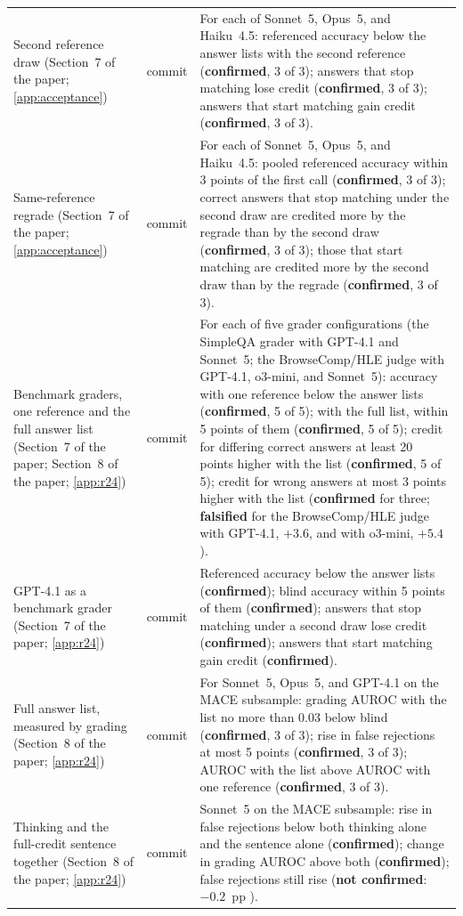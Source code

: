 {\begin{longtable}{L{3.2cm}L{1.1cm}L{8.7cm}}
Second reference draw (Section~7 of the paper; \cref{app:acceptance}) & commit & For each of Sonnet~5, Opus~5, and Haiku~4.5: referenced accuracy below the answer lists with the second reference (\textbf{confirmed}, 3 of 3); answers that stop matching lose credit (\textbf{confirmed}, 3 of 3); answers that start matching gain credit (\textbf{confirmed}, 3 of 3). \\
Same-reference regrade (Section~7 of the paper; \cref{app:acceptance}) & commit & For each of Sonnet~5, Opus~5, and Haiku~4.5: pooled referenced accuracy within 3 points of the first call (\textbf{confirmed}, 3 of 3); correct answers that stop matching under the second draw are credited more by the regrade than by the second draw (\textbf{confirmed}, 3 of 3); those that start matching are credited more by the second draw than by the regrade (\textbf{confirmed}, 3 of 3). \\
Benchmark graders, one reference and the full answer list (Section~7 of the paper; Section~8 of the paper; \cref{app:r24}) & commit & For each of five grader configurations (the SimpleQA grader with GPT-4.1 and Sonnet~5; the BrowseComp/HLE judge with GPT-4.1, o3-mini, and Sonnet~5): accuracy with one reference below the answer lists (\textbf{confirmed}, 5 of 5); with the full list, within 5 points of them (\textbf{confirmed}, 5 of 5); credit for differing correct answers at least 20 points higher with the list (\textbf{confirmed}, 5 of 5); credit for wrong answers at most 3 points higher with the list (\textbf{confirmed} for three; \textbf{falsified} for the BrowseComp/HLE judge with GPT-4.1, $+3.6$, and with o3-mini, $+5.4$). \\
GPT-4.1 as a benchmark grader (Section~7 of the paper; \cref{app:r24}) & commit & Referenced accuracy below the answer lists (\textbf{confirmed}); blind accuracy within 5 points of them (\textbf{confirmed}); answers that stop matching under a second draw lose credit (\textbf{confirmed}); answers that start matching gain credit (\textbf{confirmed}). \\
Full answer list, measured by grading (Section~8 of the paper; \cref{app:r24}) & commit & For Sonnet~5, Opus~5, and GPT-4.1 on the \textsc{MACE} subsample: grading AUROC with the list no more than 0.03 below blind (\textbf{confirmed}, 3 of 3); rise in false rejections at most 5 points (\textbf{confirmed}, 3 of 3); AUROC with the list above AUROC with one reference (\textbf{confirmed}, 3 of 3). \\
Thinking and the full-credit sentence together (Section~8 of the paper; \cref{app:r24}) & commit & Sonnet~5 on the \textsc{MACE} subsample: rise in false rejections below both thinking alone and the sentence alone (\textbf{confirmed}); change in grading AUROC above both (\textbf{confirmed}); false rejections still rise (\textbf{not confirmed}: $-0.2$~pp ). \\

\end{longtable}}
